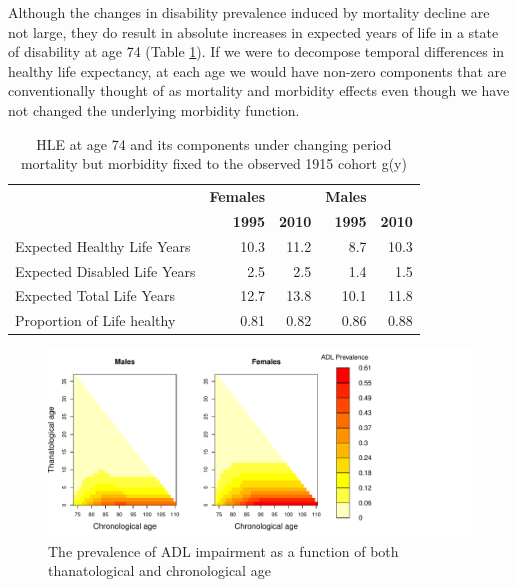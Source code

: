 \documentclass[11pt,oneside,a4paper]{article} %
\begin{document}
Although the changes in disability prevalence induced by mortality decline are not large, they do result in absolute increases in expected years of life in a state of disability at age 74 (Table \ref{tab:HLE_HRS}). If we were to decompose temporal differences in healthy life expectancy, at each age we would have non-zero components that are conventionally thought of as mortality and morbidity effects even though we have not changed the underlying morbidity function. 

\begin{table}[ht]
	\centering
		\begin{tabular}{l|rrrr}
			\toprule
		 \quad & \textbf{Females} & \quad & \textbf{Males} & \quad  \\	
		 \quad & \textbf{1995} & \textbf{2010} & \textbf{1995} & \textbf{2010} \\
	\midrule
	Expected Healthy Life Years&10.3&11.2&8.7&10.3\\
	Expected Disabled Life Years&2.5&2.5&1.4&1.5\\
	Expected Total Life Years&12.7&13.8&10.1&11.8\\
	Proportion of Life healthy&0.81&0.82&0.86&0.88\\

	\bottomrule		
		\end{tabular}
	\caption{HLE at age 74 and its components under changing period mortality but morbidity fixed to the observed 1915 cohort g(y)}
	\label{tab:HLE_HRS}
\end{table}




\begin{figure}
	\centering
		\includegraphics[width=1.1\textwidth]{Fig_ADL_thana-chrono_rev.pdf}
	\caption{The prevalence of ADL impairment as a function of both thanatological and chronological age}
	\label{fig:ADL_thana-chrono}
\end{figure}
\end{document}
